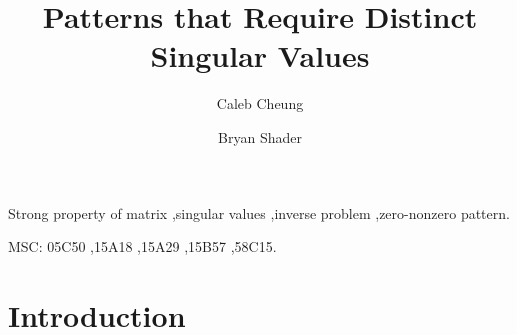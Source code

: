 \documentclass[preprint,12pt]{elsarticle}
\begin{document}
\begin{frontmatter}

\title{Patterns that Require Distinct Singular Values}


\author[label1]{Caleb Cheung} %
\author[label1]{Bryan Shader}
\begin{abstract}



\end{abstract}



\begin{keyword}
Strong property of matrix \sep  singular values \sep inverse problem \sep  zero-nonzero pattern. 

\medskip
{} MSC:
05C50 \sep 15A18 \sep 15A29 \sep  15B57 \sep 58C15.



\end{keyword}

\end{frontmatter}






\section{Introduction}
\end{document}
